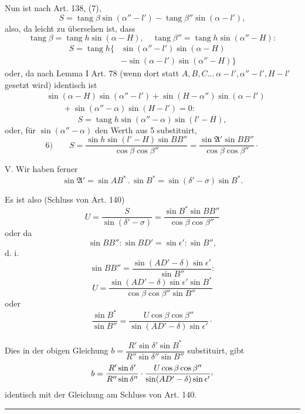 Nun ist nach Art. 138, (7),
\[
S=\operatorname{tang}\beta\sin(\alpha''-l')-\operatorname{tang}\beta''\sin(\alpha-l'),
\]
also, da leicht zu übersehen ist, dass
\[
\operatorname{tang}\beta=\operatorname{tang}h\sin(\alpha-H),\quad\operatorname{tang}\beta''=\operatorname{tang}h\sin(\alpha''-H):
\]
\[
\begin{aligned}
S=\operatorname{tang}h\{&\sin(\alpha''-l')\sin(\alpha-H)\\
&-\sin(\alpha-l')\sin(\alpha''-H)\}
\end{aligned}
\]
oder, da nach Lemma I Art. 78 (wenn dort statt \(A,B,C\ldots\ \alpha-l',\alpha''-l',H-l'\) gesetzt wird) identisch ist
\[
\begin{aligned}
&\sin(\alpha-H)\sin(\alpha''-l')+\sin(H-\alpha'')\sin(\alpha-l')\\
&\qquad+\sin(\alpha''-\alpha)\sin(H-l')=0:
\end{aligned}
\]
\[
S=\operatorname{tang}h\sin(\alpha''-\alpha)\sin(l'-H),
\]
oder, für \(\sin(\alpha''-\alpha)\) den Werth aus 5 substituirt,
\[
6)\qquad S=\frac{\sin h\sin(l'-H)\sin BB''}{\cos\beta\cos\beta''}=\frac{\sin\mathfrak{A}'\sin BB''}{\cos\beta\cos\beta''}\mathpunct{\cdot}
\]

V. Wir haben ferner
\[
\sin\mathfrak{A}'=\sin AB^*\mathbin{.}\sin B^*=\sin(\delta'-\sigma)\sin B^*.
\]

Es ist also (Schluss von Art. 140)
\[
U=\frac{S}{\sin(\delta'-\sigma)}=\frac{\sin B^*\sin BB''}{\cos\beta\cos\beta''}
\]
oder da
\[
\sin BB'':\sin BD'=\sin\epsilon':\sin B'',
\]
d. i.
\[
\sin BB''=\frac{\sin(AD'-\delta)\sin\epsilon'}{\sin B''}:
\]
\[
U=\frac{\sin(AD'-\delta)\sin\epsilon'\sin B^*}{\cos\beta\cos\beta''\sin B''}
\]
oder
\[
\frac{\sin B^*}{\sin B''}=\frac{U\cos\beta\cos\beta''}{\sin(AD'-\delta)\sin\epsilon'}\mathpunct{\cdot}
\]

Dies in der obigen Gleichung \(b=\dfrac{R'\sin\delta'\sin B^*}{R''\sin\delta''\sin B''}\) substituirt, gibt
\[
b=\frac{R'\sin\delta'}{R''\sin\delta''}\cdot\frac{U\cos\beta\cos\beta''}{\sin(AD'-\delta)\sin\epsilon'}\mathpunct{\raisebox{.45ex}{,}}
\]
identisch mit der Gleichung am Schluss von Art. 140.
\begin{center}\rule{.18\textwidth}{.35pt}\end{center}
